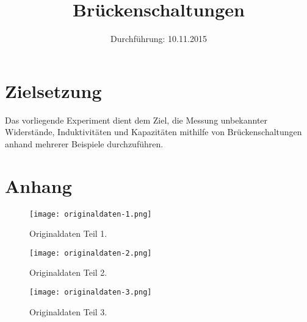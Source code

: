 

\subject{Versuchsprotokoll zum Versuch Nr. 302}
\title{Brückenschaltungen}
\date{
  Durchführung: 10.11.2015
}



\maketitle
\newpage

\section{Zielsetzung}
Das vorliegende Experiment dient dem Ziel, die Messung unbekannter Widerstände, Induktivitäten und Kapazitäten mithilfe von Brückenschaltungen anhand mehrerer Beispiele durchzuführen.






\section{Anhang}
\begin{figure}[H]
  \centering
  \texttt{[image: originaldaten-1.png]}
  \caption{Originaldaten Teil 1.}
  \label{fig:original1}
\end{figure}

\begin{figure}[H]
  \centering
  \texttt{[image: originaldaten-2.png]}
  \caption{Originaldaten Teil 2.}
  \label{fig:original2}
\end{figure}

\begin{figure}[H]
  \centering
  \texttt{[image: originaldaten-3.png]}
  \caption{Originaldaten Teil 3.}
  \label{fig:original3}
\end{figure}

\printbibliography


